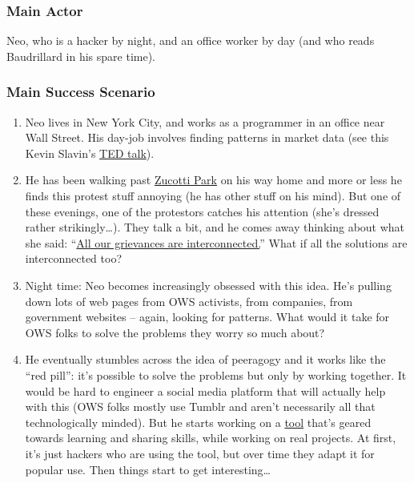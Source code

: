 \subsubsection{Main Actor}

Neo, who is a hacker by night, and an office worker by day (and who
reads Baudrillard in his spare time).

\subsubsection{Main Success Scenario}

\begin{enumerate}
\item
  Neo lives in New York City, and works as a programmer in an office
  near Wall Street. His day-job involves finding patterns in market data
  (see this Kevin Slavin's
  \href{http://www.ted.com/talks/kevin\_slavin\_how\_algorithms\_shape\_our\_world.html}{TED
  talk}).
\item
  He has been walking past
  \href{http://en.wikipedia.org/wiki/Zuccotti\_Park}{Zucotti Park} on
  his way home and more or less he finds this protest stuff annoying (he
  has other stuff on his mind). But one of these evenings, one of the
  protestors catches his attention (she's dressed rather
  strikingly\ldots{}). They talk a bit, and he comes away thinking about
  what she said:
  ``\href{http://www.nycga.net/files/2011/11/DeclarationFlowchart\_v2\_large.jpg}{All
  our grievances are interconnected.}'' What if all the solutions are
  interconnected too?
\item
  Night time: Neo becomes increasingly obsessed with this idea. He's
  pulling down lots of web pages from OWS activists, from companies,
  from government websites -- again, looking for patterns. What would it
  take for OWS folks to solve the problems they worry so much about?
\item
  He eventually stumbles across the idea of peeragogy and it works like
  the ``red pill'': it's possible to solve the problems but only by
  working together. It would be hard to engineer a social media platform
  that will actually help with this (OWS folks mostly use Tumblr and
  aren't necessarily all that technologically minded). But he starts
  working on a
  \href{http://campus.ftacademy.org/wiki/index.php/Free\_Technology\_Guild}{tool}
  that's geared towards learning and sharing skills, while working on
  real projects. At first, it's just hackers who are using the tool, but
  over time they adapt it for popular use. Then things start to get
  interesting\ldots{}
\end{enumerate}
